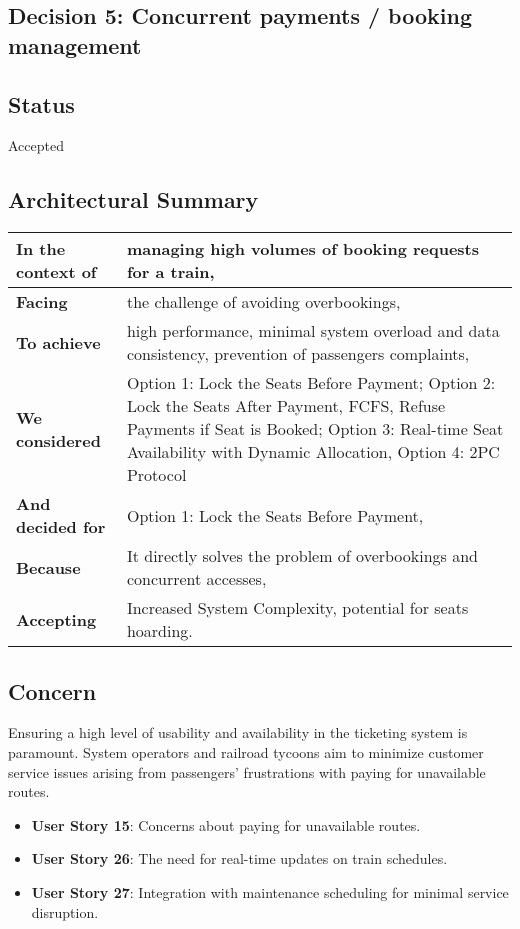 \subsection{Decision 5: Concurrent payments / booking management}

\subsection*{Status}
Accepted

\subsection*{Architectural Summary}
\begin{tabular}{|p{3.5cm}|p{10.5cm}|}
    \hline
    \textbf{In the context of} & managing high volumes of booking requests for a train, \\
    \hline
    \textbf{Facing} & the challenge of avoiding overbookings, \\
    \hline
    \textbf{To achieve} & high performance, minimal system overload and data consistency, prevention of passengers complaints, \\
    \hline
    \textbf{We considered} & Option 1: Lock the Seats Before Payment; Option 2: Lock the Seats After Payment, FCFS, Refuse Payments if Seat is Booked; Option 3: Real-time Seat Availability with Dynamic Allocation, Option 4: 2PC Protocol\\
    \hline
    \textbf{And decided for} & Option 1: Lock the Seats Before Payment,  \\
    \hline
    \textbf{Because} & It directly solves the problem of overbookings and concurrent accesses, \\
    \hline
    \textbf{Accepting} & Increased System Complexity, potential for seats hoarding. \\
    \hline
\end{tabular}

\subsection*{Concern}
Ensuring a high level of usability and availability in the ticketing system is paramount. System operators and railroad tycoons aim to minimize customer service issues arising from passengers' frustrations with paying for unavailable routes.
\begin{itemize}
    \item \textbf{User Story 15}: Concerns about paying for unavailable routes.
    \item \textbf{User Story 26}: The need for real-time updates on train schedules.
    \item \textbf{User Story 27}: Integration with maintenance scheduling for minimal service disruption.
\end{itemize}

